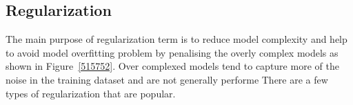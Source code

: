 \subsection{Regularization}

The main purpose of regularization term is to reduce model complexity and help to avoid model overfitting problem by penalising the overly complex models as shown in Figure~\ref{515752}. Over complexed models tend to capture more of the noise in the training dataset and are not generally performe There are a few types of regularization that are popular. 